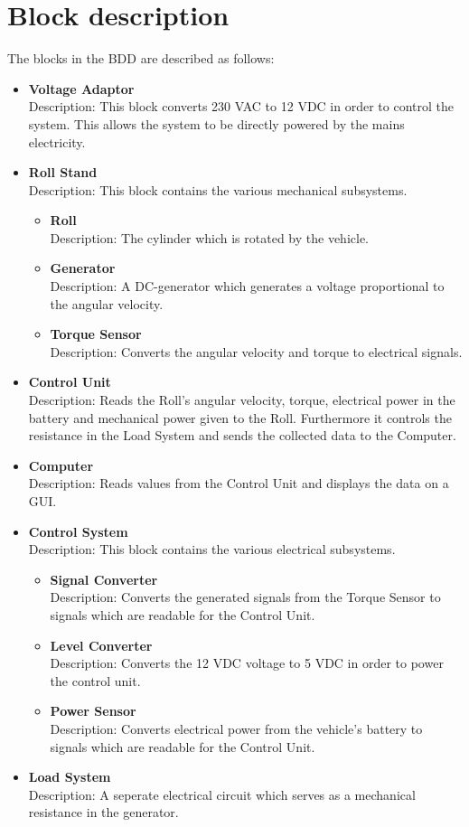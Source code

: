 \section{Block description}
The blocks in the BDD are described as follows:

\begin{itemize}
	\item \textbf{Voltage Adaptor}\\
	Description: This block converts 230 VAC to 12 VDC in order to control the system. This allows the system to be directly powered by the mains electricity.
	\item \textbf{Roll Stand}\\
	Description: This block contains the various mechanical subsystems.
	\begin{itemize}
		\item \textbf{Roll}\\
		Description: The cylinder which is rotated by the vehicle.
		\item \textbf{Generator}\\
		Description: A DC-generator which generates a voltage proportional to the angular velocity.
		\item \textbf{Torque Sensor}\\
		Description: Converts the angular velocity and torque to electrical signals.
	\end{itemize}
	\item \textbf{Control Unit}\\
	Description: Reads the Roll's angular velocity, torque, electrical power in the battery and mechanical power given to the Roll. Furthermore it controls the resistance in the Load System and sends the collected data to the Computer.
	\item \textbf{Computer}\\
	Description: Reads values from the Control Unit and displays the data on a GUI.
	\item \textbf{Control System}\\
	Description: This block contains the various electrical subsystems.
	\begin{itemize}
		\item \textbf{Signal Converter}\\
		Description: Converts the generated signals from the Torque Sensor to signals which are readable for the Control Unit.
		\item \textbf{Level Converter}\\
		Description: Converts the 12 VDC voltage to 5 VDC in order to power the control unit.
		\item \textbf{Power Sensor}\\
		Description: Converts electrical power from the vehicle's battery to signals which are readable for the Control Unit.
	\end{itemize}
	\item \textbf{Load System}\\
	Description: A seperate electrical circuit which serves as a mechanical resistance in the generator.
\end{itemize}